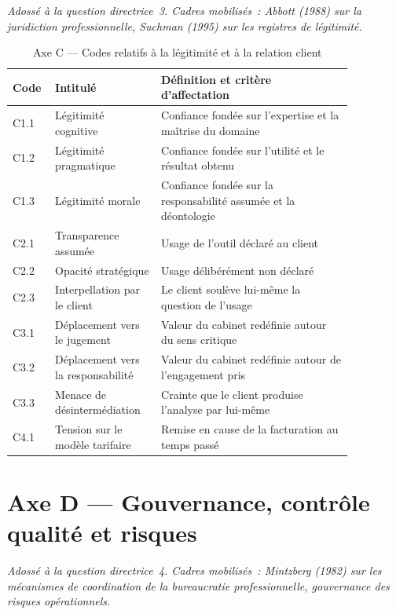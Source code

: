 \textit{Adossé à la question directrice~3. Cadres mobilisés~: Abbott (1988) sur la
juridiction professionnelle, Suchman (1995) sur les registres de légitimité.}

\begin{table}[h]
\centering
\small
\begin{tabular}{|p{0.08\linewidth}|p{0.27\linewidth}|p{0.51\linewidth}|}
\hline
\textbf{Code} & \textbf{Intitulé} & \textbf{Définition et critère d'affectation} \\
\hline
C1.1 & Légitimité cognitive & Confiance fondée sur l'expertise et la maîtrise du domaine \\
\hline
C1.2 & Légitimité pragmatique & Confiance fondée sur l'utilité et le résultat obtenu \\
\hline
C1.3 & Légitimité morale & Confiance fondée sur la responsabilité assumée et la déontologie \\
\hline
C2.1 & Transparence assumée & Usage de l'outil déclaré au client \\
\hline
C2.2 & Opacité stratégique & Usage délibérément non déclaré \\
\hline
C2.3 & Interpellation par le client & Le client soulève lui-même la question de l'usage \\
\hline
C3.1 & Déplacement vers le jugement & Valeur du cabinet redéfinie autour du sens critique \\
\hline
C3.2 & Déplacement vers la responsabilité & Valeur du cabinet redéfinie autour de l'engagement pris \\
\hline
C3.3 & Menace de désintermédiation & Crainte que le client produise l'analyse par lui-même \\
\hline
C4.1 & Tension sur le modèle tarifaire & Remise en cause de la facturation au temps passé \\
\hline
\end{tabular}
\caption{Axe C --- Codes relatifs à la légitimité et à la relation client}
\label{tab:codebook-c}
\end{table}

\section{Axe D --- Gouvernance, contrôle qualité et risques}

\textit{Adossé à la question directrice~4. Cadres mobilisés~: Mintzberg (1982) sur les
mécanismes de coordination de la bureaucratie professionnelle, gouvernance des risques
opérationnels.}

